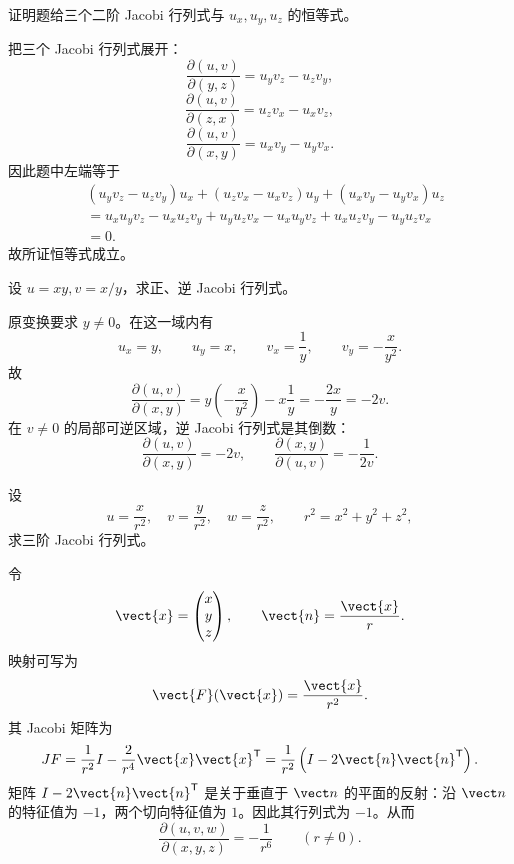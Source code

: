 \begin{xexercise}[20.3.3 练习题 11]
证明题给三个二阶 Jacobi 行列式与 $u_x,u_y,u_z$ 的恒等式。
\end{xexercise}
\begin{xsolution}
把三个 Jacobi 行列式展开：
\[
  \frac{\partial(u,v)}{\partial(y,z)}=u_yv_z-u_zv_y,
\]
\[
  \frac{\partial(u,v)}{\partial(z,x)}=u_zv_x-u_xv_z,
\]
\[
  \frac{\partial(u,v)}{\partial(x,y)}=u_xv_y-u_yv_x.
\]
因此题中左端等于
\begin{align*}
 &(u_yv_z-u_zv_y)u_x
 +(u_zv_x-u_xv_z)u_y
 +(u_xv_y-u_yv_x)u_z\\
 &=u_xu_yv_z-u_xu_zv_y
   +u_yu_zv_x-u_xu_yv_z
   +u_xu_zv_y-u_yu_zv_x\\
 &=0.
\end{align*}
故所证恒等式成立。
\end{xsolution}

\begin{xexercise}[20.3.3 练习题 12]
设 $u=xy,v=x/y$，求正、逆 Jacobi 行列式。
\end{xexercise}
\begin{xsolution}
原变换要求 $y\ne0$。在这一域内有
\[
  u_x=y,
  \qquad u_y=x,
  \qquad
  v_x=\frac1y,
  \qquad v_y=-\frac{x}{y^2}.
\]
故
\[
  \frac{\partial(u,v)}{\partial(x,y)}
  =y\left(-\frac{x}{y^2}\right)-x\frac1y
  =-\frac{2x}{y}=-2v.
\]
在 $v\ne0$ 的局部可逆区域，逆 Jacobi 行列式是其倒数：
\[
  \boxed{\displaystyle
    \frac{\partial(u,v)}{\partial(x,y)}=-2v,
    \qquad
    \frac{\partial(x,y)}{\partial(u,v)}=-\frac1{2v}}.
\]
\end{xsolution}

\begin{xexercise}[20.3.3 练习题 13]
设
\[
  u=\frac{x}{r^2},\quad v=\frac{y}{r^2},\quad w=\frac{z}{r^2},
  \qquad r^2=x^2+y^2+z^2,
\]
求三阶 Jacobi 行列式。
\end{xexercise}
\begin{xsolution}
令
\[
  \vect{x}=\begin{pmatrix}x\\y\\z\end{pmatrix},
  \qquad
  \vect{n}=\frac{\vect{x}}r.
\]
映射可写为
\[
  \vect{F}(\vect{x})=\frac{\vect{x}}{r^2}.
\]
其 Jacobi 矩阵为
\[
  JF=\frac1{r^2}I-\frac2{r^4}\vect{x}\vect{x}^{\mathsf T}
  =\frac1{r^2}\left(I-2\vect{n}\vect{n}^{\mathsf T}\right).
\]
矩阵 $I-2\vect{n}\vect{n}^{\mathsf T}$ 是关于垂直于 $\vect n$ 的平面的反射：沿 $\vect n$ 的特征值为 $-1$，两个切向特征值为 $1$。因此其行列式为 $-1$。从而
\[
  \boxed{\displaystyle
    \frac{\partial(u,v,w)}{\partial(x,y,z)}
    =-\frac1{r^6}}
  \qquad(r\ne0).
\]
\end{xsolution}

